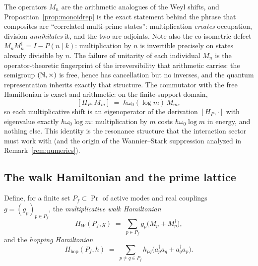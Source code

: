 The operators $M_{n}$ are the arithmetic analogues of the Weyl shifts, and
Proposition~\ref{prop:monoidrep} is the exact statement behind the phrase that
composites are ``correlated multi-prime states'': multiplication \emph{creates} occupation,
division \emph{annihilates} it, and the two are adjoints. Note also the co-isometric defect
$M_{n}M_{n}^{\dagger}=I-P(n\mid k)$: multiplication by $n$ is invertible precisely on states
already divisible by $n$. The failure of unitarity of each individual $M_{n}$ is the
operator-theoretic fingerprint of the irreversibility that arithmetic carries:
the semigroup $(\mathbb{N},\times)$ is
free, hence has cancellation but no inverses, and the quantum representation inherits exactly
that structure. The commutator with the free Hamiltonian is exact and arithmetic: on the
finite-support domain,
\begin{equation}\label{eq:commMm}
[H_{P},M_{m}]\;=\;\hbar\omega_{0}(\log m)\,M_{m},
\end{equation}
so each multiplicative shift is an eigenoperator of the derivation $[H_{P},\cdot]$ with
eigenvalue exactly $\hbar\omega_{0}\log m$: multiplication by $m$ costs $\hbar\omega_{0}\log m$
in energy, and nothing else. This identity is the resonance structure that the interaction
sector must work with (and the origin of the Wannier--Stark suppression analyzed in
Remark~\ref{rem:numerics}).

\subsection{The walk Hamiltonian and the prime lattice}\label{sec:walk}

Define, for a finite set $P_{f}\subset\Pr$ of active modes and real couplings
$g=(g_{p})_{p\in P_{f}}$, the \emph{multiplicative walk Hamiltonian}
\begin{equation}\label{eq:walkH}
H_{W}(P_{f},g)\;=\;\sum_{p\in P_{f}}g_{p}\bigl(M_{p}+M_{p}^{\dagger}\bigr),
\end{equation}
and the \emph{hopping Hamiltonian}
\begin{equation}\label{eq:hopH}
H_{\mathrm{hop}}(P_{f},h)\;=\;\sum_{p\neq q\in P_{f}}h_{pq}
\bigl(a_{p}^{\dagger}a_{q}+a_{q}^{\dagger}a_{p}\bigr).
\end{equation}

